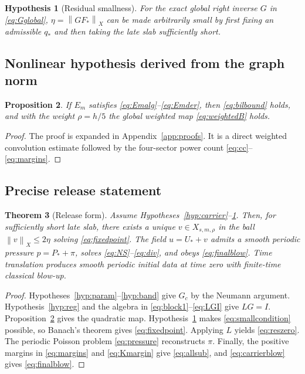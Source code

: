 \documentclass[11pt]{article}
\newtheorem{theorem}{Theorem}[section]
\newtheorem{proposition}[theorem]{Proposition}
\newtheorem{hypothesis}[theorem]{Hypothesis}
\numberwithin{equation}{section}
\newcommand{\norm}[1]{\left\lVert #1\right\rVert}
\begin{document}
\begin{hypothesis}[Residual smallness]\label{hyp:eta}
For the exact global right inverse \(G\) in \eqref{eq:Gglobal}, \(\eta=\norm{GF_*}_X\) can be made arbitrarily small by first fixing an admissible \(q_*\) and then taking the late slab sufficiently short.
\end{hypothesis}

\subsection{Nonlinear hypothesis derived from the graph norm}
\begin{proposition}\label{prop:Bappendix}
If \(E_m\) satisfies \eqref{eq:Emalg}--\eqref{eq:Emder}, then \eqref{eq:bilbound} holds, and with the weight \(\rho=h/5\) the global weighted map \eqref{eq:weightedB} holds.
\end{proposition}
\begin{proof}
The proof is expanded in Appendix~\ref{app:proofs}.  It is a direct weighted convolution estimate followed by the four-sector power count \eqref{eq:cc}--\eqref{eq:margins}.
\end{proof}

\subsection{Precise release statement}
\begin{theorem}[Release form]\label{thm:release}
Assume Hypotheses~\ref{hyp:carrier}--\ref{hyp:eta}.  Then, for sufficiently short late slab, there exists a unique \(v\in X_{s,m,\rho}\) in the ball \(\norm v_X\le2\eta\) solving \eqref{eq:fixedpoint}.  The field \(u=U_*+v\) admits a smooth periodic pressure \(p=P_*+\pi\), solves \eqref{eq:NS}--\eqref{eq:div}, and obeys \eqref{eq:finalblow}.  Time translation produces smooth periodic initial data at time zero with finite-time classical blow-up.
\end{theorem}
\begin{proof}
Hypotheses~\ref{hyp:param}--\ref{hyp:band} give \(G_c\) by the Neumann argument.  Hypothesis~\ref{hyp:reg} and the algebra in \eqref{eq:block1}--\eqref{eq:LGI} give \(LG=I\).  Proposition~\ref{prop:Bappendix} gives the quadratic map.  Hypothesis~\ref{hyp:eta} makes \eqref{eq:smallcondition} possible, so Banach's theorem gives \eqref{eq:fixedpoint}.  Applying \(L\) yields \eqref{eq:reszero}.  The periodic Poisson problem \eqref{eq:pressure} reconstructs \(\pi\).  Finally, the positive margins in \eqref{eq:margins} and \eqref{eq:Kmargin} give \eqref{eq:allsub}, and \eqref{eq:carrierblow} gives \eqref{eq:finalblow}.
\end{proof}
\end{document}
